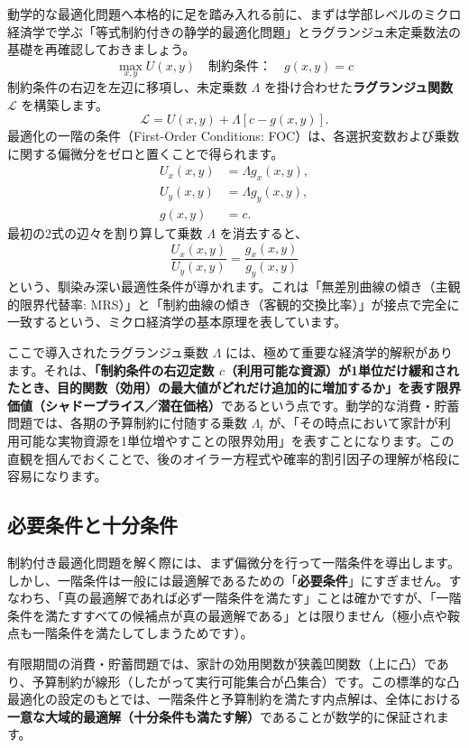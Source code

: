 \documentclass[
  japanese,
  lualatex,
  ja=standard,
  12pt,
  a4paper]{ltjsarticle}
\begin{document}
動学的な最適化問題へ本格的に足を踏み入れる前に、まずは学部レベルのミクロ経済学で学ぶ「等式制約付きの静学的最適化問題」とラグランジュ未定乗数法の基礎を再確認しておきましょう。
\[
\max_{x,y} U(x,y) \quad \text{制約条件：} \quad g(x,y) = c
\] 制約条件の右辺を左辺に移項し、未定乗数 \(\Lambda\)
を掛け合わせた\textbf{ラグランジュ関数} \(\mathcal{L}\) を構築します。
\[
\mathcal{L} = U(x,y) + \Lambda [c - g(x,y)].
\] 最適化の一階の条件（First-Order Conditions:
FOC）は、各選択変数および乗数に関する偏微分をゼロと置くことで得られます。
\[
\begin{aligned}
U_x(x,y) &= \Lambda g_x(x,y),\\
U_y(x,y) &= \Lambda g_y(x,y),\\
g(x,y) &= c.
\end{aligned}
\] 最初の2式の辺々を割り算して乗数 \(\Lambda\) を消去すると、 \[
\frac{U_x(x,y)}{U_y(x,y)} = \frac{g_x(x,y)}{g_y(x,y)}
\]
という、馴染み深い最適性条件が導かれます。これは「無差別曲線の傾き（主観的限界代替率:
MRS）」と「制約曲線の傾き（客観的交換比率）」が接点で完全に一致するという、ミクロ経済学の基本原理を表しています。

ここで導入されたラグランジュ乗数 \(\Lambda\)
には、極めて重要な経済学的解釈があります。それは、\textbf{「制約条件の右辺定数
\(c\)（利用可能な資源）が1単位だけ緩和されたとき、目的関数（効用）の最大値がどれだけ追加的に増加するか」を表す限界価値（シャドープライス／潜在価格）}であるという点です。動学的な消費・貯蓄問題では、各期の予算制約に付随する乗数
\(\Lambda_t\)
が、「その時点において家計が利用可能な実物資源を1単位増やすことの限界効用」を表すことになります。この直観を掴んでおくことで、後のオイラー方程式や確率的割引因子の理解が格段に容易になります。

\subsection{必要条件と十分条件}\label{ux5fc5ux8981ux6761ux4ef6ux3068ux5341ux5206ux6761ux4ef6}

制約付き最適化問題を解く際には、まず偏微分を行って一階条件を導出します。しかし、一階条件は一般には最適解であるための「\textbf{必要条件}」にすぎません。すなわち、「真の最適解であれば必ず一階条件を満たす」ことは確かですが、「一階条件を満たすすべての候補点が真の最適解である」とは限りません（極小点や鞍点も一階条件を満たしてしまうためです）。

有限期間の消費・貯蓄問題では、家計の効用関数が狭義凹関数（上に凸）であり、予算制約が線形（したがって実行可能集合が凸集合）です。この標準的な凸最適化の設定のもとでは、一階条件と予算制約を満たす内点解は、全体における\textbf{一意な大域的最適解（十分条件も満たす解）}であることが数学的に保証されます。
\end{document}
